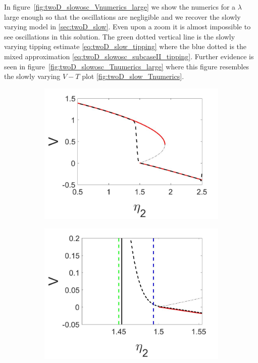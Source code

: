 In figure~\ref{fig:twoD_slowosc_Vnumerics_large} we show the numerics for a $\lambda$ large enough so that the oscillations are negligible and we recover the slowly varying model in \autoref{sec:twoD_slow}. Even upon a zoom it is almost impossible to see oscillations in this solution. The green dotted vertical line is the slowly varying tipping estimate \eqref{eq:twoD_slow_tipping} where the blue dotted is the mixed approximation \eqref{eq:twoD_slowosc_subcaseII_tipping}. Further evidence is seen in figure~\ref{fig:twoD_slowosc_Tnumerics_large} where this figure resembles the slowly varying $V-T$ plot \eqref{fig:twoD_slow_Tnumerics}.

\begin{figure}[H]
\centering
\begin{subfigure}{.5\textwidth}
 \centering
 \includegraphics[width=\linewidth]{twoD/slowosc_bif_diagram_large.jpg}
 \caption{}
\end{subfigure}%
\begin{subfigure}{.5\textwidth}
 \centering
 \includegraphics[width=\linewidth]{twoD/slowosc_bif_diagram_large_zoom.jpg}

\end{subfigure}
\end{figure}
